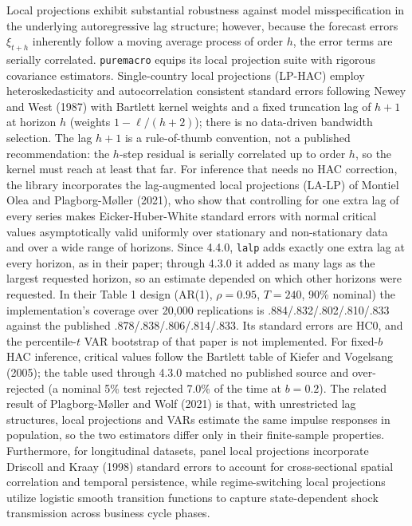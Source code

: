 \documentclass[11pt,letterpaper]{article}
\renewcommand{\_}{\pmunderscore\allowbreak}
\begin{document}
Local projections exhibit substantial robustness against model misspecification in the underlying autoregressive lag structure; however, because the forecast errors \(\xi_{t+h}\) inherently follow a moving average process of order \(h\), the error terms are serially correlated. \texttt{puremacro} equips its local projection suite with rigorous covariance estimators. Single-country local projections (LP-HAC) employ heteroskedasticity and autocorrelation consistent standard errors following Newey and West (1987) with Bartlett kernel weights and a fixed truncation lag of \(h+1\) at horizon \(h\) (weights \(1 - \ell/(h+2)\)); there is no data-driven bandwidth selection. The lag \(h+1\) is a rule-of-thumb convention, not a published recommendation: the \(h\)-step residual is serially correlated up to order \(h\), so the kernel must reach at least that far. For inference that needs no HAC correction, the library incorporates the lag-augmented local projections (LA-LP) of Montiel Olea and Plagborg-Møller (2021), who show that controlling for one extra lag of every series makes Eicker-Huber-White standard errors with normal critical values asymptotically valid uniformly over stationary and non-stationary data and over a wide range of horizons. Since 4.4.0, \texttt{la\_lp} adds exactly one extra lag at every horizon, as in their paper; through 4.3.0 it added as many lags as the largest requested horizon, so an estimate depended on which other horizons were requested. In their Table 1 design (AR(1), \(\rho = 0.95\), \(T = 240\), 90\% nominal) the implementation's coverage over 20,000 replications is .884/.832/.802/.810/.833 against the published .878/.838/.806/.814/.833. Its standard errors are HC0, and the percentile-\(t\) VAR bootstrap of that paper is not implemented. For fixed-\(b\) HAC inference, critical values follow the Bartlett table of Kiefer and Vogelsang (2005); the table used through 4.3.0 matched no published source and over-rejected (a nominal 5\% test rejected 7.0\% of the time at \(b = 0.2\)). The related result of Plagborg-Møller and Wolf (2021) is that, with unrestricted lag structures, local projections and VARs estimate the same impulse responses in population, so the two estimators differ only in their finite-sample properties. Furthermore, for longitudinal datasets, panel local projections incorporate Driscoll and Kraay (1998) standard errors to account for cross-sectional spatial correlation and temporal persistence, while regime-switching local projections utilize logistic smooth transition functions to capture state-dependent shock transmission across business cycle phases.
\end{document}
